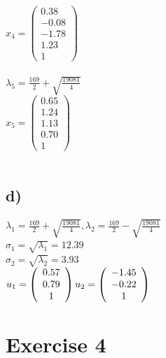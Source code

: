 \documentclass[a4paper,10pt]{article}
\begin{document}
$x_4 =  \left(
\begin{array}{c}
0.38\\
-0.08\\
-1.78\\
1.23\\
1
\end{array}
\right)$ \\ \\
$\lambda_{5}=\frac{169}{2} + \sqrt{\frac{19081}{4}} $ \\
$x_5 =  \left(
\begin{array}{c}
0.65\\
1.24\\
1.13\\
0.70\\
1
\end{array}
\right)$ \\ \\
\subsection*{d)}
$\lambda_1=\frac{169}{2} + \sqrt{\frac{19081}{4}},\lambda_2 = \frac{169}{2} - \sqrt{\frac{19081}{4}}$ \\
$\sigma_1=\sqrt{\lambda_1}=12.39$ \\
$\sigma_2=\sqrt{\lambda_2}=3.93$ \\
$u_1=\left(
\begin{array}{c}
0.57\\
0.79\\
1\\
\end{array}
\right) \\
u_2= \left(
\begin{array}{c}
-1.45\\
-0.22\\
1\\
\end{array}
\right)$
\section*{Exercise 4}
\end{document}
